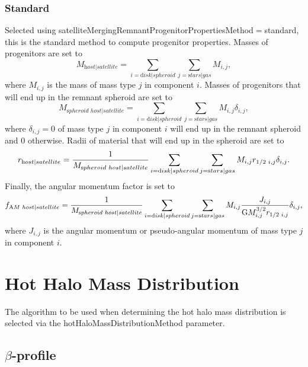 \subsubsection{Standard}

Selected using {\normalfont \ttfamily satelliteMergingRemnantProgenitorPropertiesMethod}$=${\normalfont \ttfamily standard}, this is the standard method to compute progenitor properties. Masses of progenitors are set to
\begin{equation}
 M_{\mathrm host|satellite} = \sum_{i={\mathrm disk|spheroid}} \sum_{j={\mathrm stars|gas}} M_{i,j},
\end{equation}
where $M_{i,j}$ is the mass of mass type $j$ in \gls{component} $i$. Masses of progenitors that will end up in the remnant spheroid are set to
\begin{equation}
 M_{\mathrm spheroid\,\,host|satellite} = \sum_{i={\mathrm disk|spheroid}} \sum_{j={\mathrm stars|gas}} M_{i,j} \delta_{i,j},
\end{equation}
where $\delta_{i,j}=0$ of mass type $j$ in \gls{component} $i$ will end up in the remnant spheroid and $0$ otherwise. Radii of material that will end up in the spheroid are set to
\begin{equation}
 r_{\mathrm host|satellite} = {1 \over M_{\mathrm spheroid\,\,host|satellite}} \sum_{i={\mathrm disk|spheroid}} \sum_{j={\mathrm stars|gas}} M_{i,j} r_{1/2\,\,i,j} \delta_{i,j}.
\end{equation}
Finally, the angular momentum factor is set to
\begin{equation}
 f_{\mathrm AM\,\,host|satellite} = {1 \over M_{\mathrm spheroid\,\,host|satellite}} \sum_{i={\mathrm disk|spheroid}} \sum_{j={\mathrm stars|gas}} M_{i,j} {J_{i,j} \over {\mathrm G} M^{3/2}_{i,j} r_{1/2\,\,i,j}} \delta_{i,j},
\end{equation}
where $J_{i,j}$ is the angular momentum or pseudo-angular momentum of mass type $j$ in \gls{component} $i$.

\section{Hot Halo Mass Distribution}

The algorithm to be used when determining the hot halo mass distribution is selected via the {\normalfont \ttfamily hotHaloMassDistributionMethod} parameter.

\subsection{$\beta$-profile}\label{phys:hotHaloMassDistribution:hotHaloMassDistributionBetaProfile}

